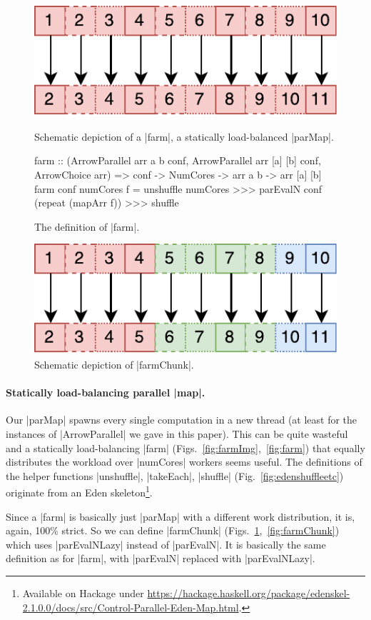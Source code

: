 \begin{figure}[thb]
\includegraphics[scale=0.7]{images/farm}
\caption{Schematic depiction of a |farm|, a statically
      load-balanced |parMap|.}
\label{fig:farmImg}

\begin{code}
farm :: (ArrowParallel arr a b conf,
	ArrowParallel arr [a] [b] conf, ArrowChoice arr) =>
	conf -> NumCores -> arr a b -> arr [a] [b]
farm conf numCores f =
	unshuffle numCores >>>
	parEvalN conf (repeat (mapArr f)) >>>
	shuffle
\end{code}
\caption{The definition of |farm|.}
\label{fig:farm}

\includegraphics[scale=0.7]{images/farmChunk}
\caption{Schematic depiction of |farmChunk|.}
\label{fig:farmChunkImg}
\end{figure}

\paragraph{Statically load-balancing parallel |map|.}
Our |parMap| spawns every single computation in a new thread (at least for the instances of |ArrowParallel| we gave in this paper). This can be quite wasteful and a statically load-balancing |farm| (Figs.~\ref{fig:farmImg},~\ref{fig:farm}) that equally distributes the workload over |numCores| workers seems useful.
The definitions of the helper functions |unshuffle|, |takeEach|, |shuffle| (Fig.~\ref{fig:edenshuffleetc}) originate from an Eden skeleton\footnote{Available on Hackage under \url{https://hackage.haskell.org/package/edenskel-2.1.0.0/docs/src/Control-Parallel-Eden-Map.html}.}.

Since a |farm|  is basically just |parMap| with a different work distribution, it is, again, 100\% strict. So we can define |farmChunk| (Figs.~\ref{fig:farmChunkImg},~\ref{fig:farmChunk}) which uses |parEvalNLazy| instead of |parEvalN|. It is basically the same definition as for |farm|, with |parEvalN| replaced with |parEvalNLazy|.


